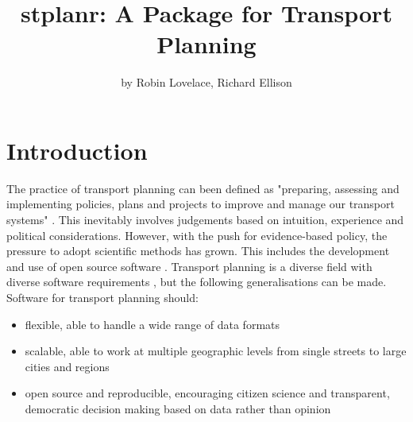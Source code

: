 \title{stplanr: A Package for Transport Planning}
\author{by Robin Lovelace, Richard Ellison}

\maketitle


\section{Introduction}\label{introduction}

The practice of transport planning can been defined as
"preparing, assessing and implementing policies, plans and projects to
improve and manage our transport systems"
\citep{jones_road_2014}.
This inevitably involves judgements based on intuition, experience and political considerations.
However, with the push for evidence-based policy, the pressure to adopt scientific methods has grown.
This includes the development and use of open source software \citep{balmer_matsim-t:_2009}.
Transport planning is a diverse field with diverse software requirements \citep{boyce_forecasting_2015}, but the following generalisations can be made.
Software for transport planning should:

\begin{itemize}
\tightlist
\item
  flexible, able to handle a wide range of data formats
\item
  scalable, able to work at multiple geographic levels from single streets to large cities and regions
\item
  open source and reproducible, encouraging citizen science and transparent, democratic decision making based on data rather than opinion
\end{itemize}

